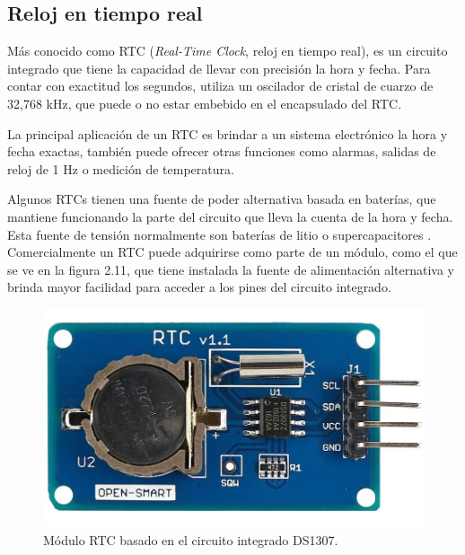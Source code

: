 
\subsection{Reloj en tiempo real}

Más conocido como RTC (\textit{Real-Time Clock}, reloj en tiempo real), es un circuito integrado que tiene la capacidad de llevar con precisión la hora y fecha. Para contar con exactitud los segundos, utiliza un oscilador de cristal de cuarzo de 32,768 kHz, que puede o no estar embebido en el encapsulado del RTC.

La principal aplicación de un RTC es brindar a un sistema electrónico la hora y fecha exactas,  también puede ofrecer otras funciones como alarmas, salidas de reloj de 1 Hz o medición de temperatura.

Algunos RTCs tienen una fuente de poder alternativa basada en baterías, que mantiene funcionando la parte del circuito que lleva la cuenta de la hora y fecha. Esta fuente de tensión normalmente son baterías de litio o supercapacitores \citep{WEBSITE:16}. Comercialmente un RTC puede adquirirse como parte de un módulo, como el que se ve en la figura 2.11, que tiene instalada la fuente de alimentación alternativa y brinda mayor facilidad para acceder a los pines del circuito integrado.

\begin{figure}[h]
	\centering
	\includegraphics[scale=0.18]{./Figures/rtc.jpg}
	\caption{Módulo RTC basado en el circuito integrado DS1307\protect\footnotemark.}
	\label{fig:cuadradoAzul}
\end{figure}


